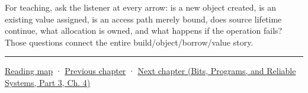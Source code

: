 For teaching, ask the listener at every arrow: is a new object created, is an existing value assigned, is an access path merely bound, does source lifetime continue, what allocation is owned, and what happens if the operation fails? Those questions connect the entire build/object/borrow/value story.

\begin{center}\rule{0.5\linewidth}{0.5pt}\end{center}

\hyperref[volume-reading-map]{Reading map} · \hyperref[01-foundations-i-ch002-values-at-addresses-layout-lifetimes-and-representation]{Previous chapter} · \href{../01-Bits-Programs-and-Reliable-Systems-P03/main.pdf\#nameddest=01-foundations-i-ch004-prove-c-ownership-with-runnable-experiments}{Next chapter (Bits, Programs, and Reliable Systems, Part 3, Ch. 4)}
